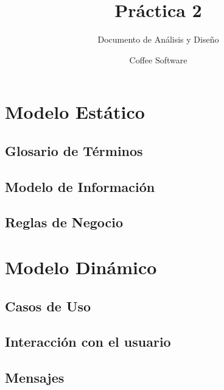 \documentclass[11pt]{book}
\title{Práctica 2}
\author{Coffee Software}
\subtitle{Documento de Análisis y Diseño}
\date{}
\begin{document}
\maketitle
{}
\tableofcontents

\part{Modelo Estático}

\chapter{Glosario de Términos}
\label{ch:Glosario}


\chapter{Modelo de Información}
\label{ch:ModeloInformacion}


\chapter{Reglas de Negocio}
\label{ch:Negocio}


\part{Modelo Dinámico}

\chapter{Casos de Uso}
\label{ch:CasosDeUso}


\chapter{Interacción con el usuario}
\label{ch:Interaccion}


\appendix
\chapter{Mensajes}
\label{ch:Mensajes}
\end{document}

